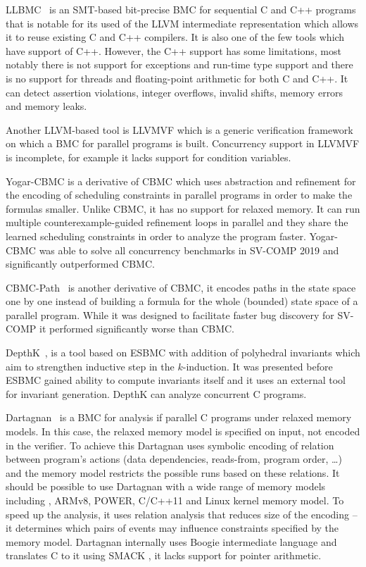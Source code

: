 LLBMC~ is an SMT-based bit-precise BMC for
sequential C and C++ programs that is notable for its used of the LLVM
intermediate representation which allows it to reuse existing C and C++
compilers.
It is also one of the few tools which have support of C++.
However, the C++ support has some limitations, most notably there is not
support for exceptions and run-time type support and there is no support for
threads and floating-point arithmetic for both C and C++.
It can detect assertion violations, integer overflows, invalid shifts, memory
errors and memory leaks.

Another LLVM-based tool is LLVMVF  which is a generic verification framework on which a BMC for parallel programs is built.
Concurrency support in LLVMVF is incomplete, for example it lacks support for condition variables.

Yogar-CBMC  is a derivative of CBMC which uses
abstraction and refinement for the encoding of scheduling constraints in
parallel programs in order to make the formulas smaller.
Unlike CBMC, it has no support for relaxed memory.
It can run multiple counterexample-guided refinement loops in parallel and they
share the learned scheduling constraints in order to analyze the program
faster.
Yogar-CBMC was able to solve all concurrency benchmarks in SV-COMP 2019 and significantly outperformed CBMC.

CBMC-Path~ is another derivative of CBMC, it encodes paths in
the state space one by one instead of building a formula for the whole
(bounded) state space of a parallel program.
While it was designed to facilitate faster bug discovery for SV-COMP it performed significantly worse than CBMC.

DepthK~, is a tool based on ESBMC with
addition of polyhedral invariants which aim to strengthen inductive step in the
$k$-induction.
It was presented before ESBMC gained ability to compute invariants itself and it uses an external tool for invariant generation.
DepthK can analyze concurrent C programs.

Dartagnan~ is a BMC for analysis if parallel C programs under relaxed memory models.
In this case, the relaxed memory model is specified on input, not encoded in the verifier.
To achieve this Dartagnan uses symbolic encoding of relation between program's actions (data dependencies, reads-from, program order, …) and the memory model restricts the possible runs based on these relations.
It should be possible to use Dartagnan with a wide range of memory models including \xtso, ARMv8, POWER, C/C++11 and Linux kernel memory model.
To speed up the analysis, it uses relation analysis that reduces size of the encoding -- it determines which pairs of events may influence constraints specified by the memory model.
Dartagnan internally uses Boogie intermediate language and translates C to it using SMACK , it lacks support for pointer arithmetic.

